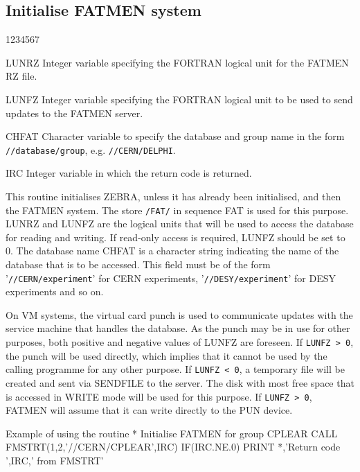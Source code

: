 \subsection{Initialise FATMEN system}
\begin{DLtt}{1234567}
\item[LUNRZ]Integer variable specifying the FORTRAN logical unit for the
FATMEN RZ file.
\item[LUNFZ]Integer variable specifying the FORTRAN logical unit to be used
to send updates to the FATMEN server.
\item[CHFAT]
Character variable to specify the database and group name
in the form {\tt//database/group}, e.g. {\tt//CERN/DELPHI}.
\item[IRC]Integer variable in which the return code is returned.
\end{DLtt}
\par
This routine initialises ZEBRA, unless it has already been
initialised, and then the FATMEN system.
The store {\tt/FAT/} in sequence FAT is used for this purpose.
LUNRZ and LUNFZ are the logical
units that will be used to access the database for reading and writing.
If read-only access is required, LUNFZ should be set to 0.
The database name CHFAT
is a character string indicating the name of the database that is to be
accessed. This field must be of the form '{\tt//CERN/experiment}' for
CERN experiments, '{\tt//DESY/experiment}' for DESY experiments and so on.
\par
On VM systems, the virtual card punch is used to communicate updates
with the service machine that handles the database.
As the punch may
be in use for other purposes, both positive and negative values of
LUNFZ are foreseen.
If {\tt LUNFZ > 0}, the punch will be used directly,
which implies that it cannot be used by the calling programme for
any other purpose.
If {\tt LUNFZ < 0}, a temporary file will be created and
sent via SENDFILE to the server.
The disk with most free space
that is accessed in WRITE mode will be used for this purpose.
If {\tt LUNFZ > 0}, FATMEN will assume that it can write directly to the
PUN device.
\begin{XMPt}{Example of using the \protect{} routine}
*     Initialise FATMEN for group CPLEAR
      CALL FMSTRT(1,2,'//CERN/CPLEAR',IRC)
      IF(IRC.NE.0) PRINT *,'Return code ',IRC,' from FMSTRT'
\end{XMPt}
